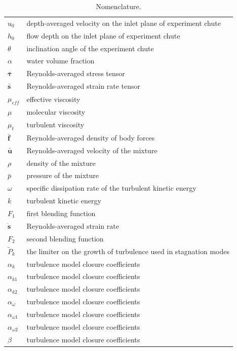 \documentclass[mathematics,article,submit,pdftex,moreauthors]{Definitions/mdpi}
\begin{document}
\begin{table}[H] 
\caption{Nomenclature.\label{A:tab1}}
\begin{tabularx}{\textwidth}{ll}
\toprule
$u_0$		& depth-averaged velocity on the inlet plane of experiment chute	\\
$h_0$		& flow depth on the inlet plane of experiment chute	\\
$\theta$	& inclination angle of the experiment chute \\
$\alpha$	& water volume fraction	\\
$\bar{\boldsymbol{\tau}}$	& Reynolds-averaged stress tensor	\\
$\bar{\boldsymbol{s}}$		& Reynolds-averaged strain rate tensor	\\
$\mu_{eff}$		& effective viscosity	\\
$\mu$		& molecular viscosity	\\
$\mu_{t}$		& turbulent viscosity	\\
$\bar{\boldsymbol{f}}$		& Reynolds-averaged density of body forces	\\
$\bar{\boldsymbol{u}}$		& Reynolds-averaged velocity of the mixture	\\
$\rho$		& density of the mixture	\\
$\bar{p}$		& pressure of the mixture	\\
$\omega$		& specific dissipation rate of the turbulent kinetic energy	\\
$k$		& 	turbulent kinetic energy \\
$F_1$		& first blending function	\\
$\dot{\boldsymbol{s}}$		& Reynolds-averaged strain rate	\\
$F_2$		& second blending function	\\
$\widetilde{P}_k$ & the limiter on the growth of turbulence used in stagnation modes \\
$\alpha_k$ & turbulence model closure coefficients \\
$\alpha_{k1}$ & turbulence model closure coefficients \\
$\alpha_{k2}$ & turbulence model closure coefficients \\
$\alpha_\omega$ & turbulence model closure coefficients \\
$\alpha_{\omega1}$ & turbulence model closure coefficients \\
$\alpha_{\omega2}$ & turbulence model closure coefficients \\
$\beta$ & turbulence model closure coefficients \\

\end{tabularx}
\end{table}
\end{document}
